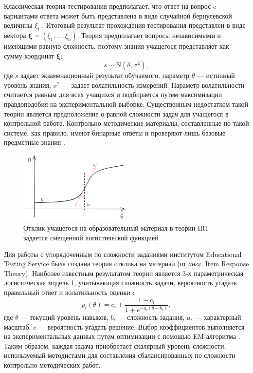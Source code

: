 Классическая теория тестирования предполагает, что ответ на вопрос c вариантами ответа может быть представлена в виде
случайной бернулевской величины $\xi_i$ \cite{traub1997classical}. Итоговый результат прохождения тестирования представлен
в виде вектора $\mathbf{\xi} =(\xi_1,\dots,\xi_n)$. Теория предполагает вопросы независимыми и имеющими равную сложность, поэтому
знания учащегося представляет как сумму координат $\mathbf{\xi}$:
\begin{equation}
    s \sim \mathrm{N}(\theta,\sigma^2), 
\end{equation}
где $s$ задает экзаменационный результат обучаемого, параметр $\theta$ --- истинный уровень знания, 
$\sigma^2$ --- задает волатильность измерений. Параметр волатильности  считается равным для всех учащихся и подбирается
путем максимизации правдоподобия на экспериментальной выборке. Существенным недостатком такой теории является предположение 
о равной сложности задач для учащегося в контрольной работе. Контрольно-методические материалы, составленные по такой системе,
как правило, имеют бинарные ответы и проверяют лишь базовые предметные знания \cite{van1994likert}.  

\begin{figure}[h]
    \centering
    \includegraphics[width=0.5\textwidth]{assets/pedagogic/social/irt.excalidraw.png}
    \caption{Отклик учащегося на образовательный материал в теории IRT задается смещенной логистичеcкой функцией}
    \label{irt_function}
\end{figure}

Для работы с упорядоченным по сложности заданиями  институтом Educational Testing Service 
была создана теория отклика на материал (от \textit{англ.} Item Response Theory)\cite{lord2012applications}. 
Наиболее известным результатом теории является 3-х параметрическая логистическая модель \ref{irt_function}, учитывающая сложность задачи,
вероятность угадать правильный ответ и волатильность оценки \cite{lord1956measurement}:
\begin{equation}
    p_i(\theta) = c_i + \frac{1-c_i}{1+e^{-a_i(\theta-b_i)}},
\end{equation}
где $\theta$ --- текущий уровень навыков, $b_i$ --- сложность задания, $a_i$ --- характерный масштаб, $c$ --- вероятность угадать решение.
Выбор коэффициентов выполняется на экспериментальных данных путем оптимизации с помощью EM-алгоритма \cite{bock1981marginal}. 
Таким образом, каждая задача приобретает скалярный уровень сложности, используемый методистами для составления сбалансированных по сложности
контрольно-методических работ. 


